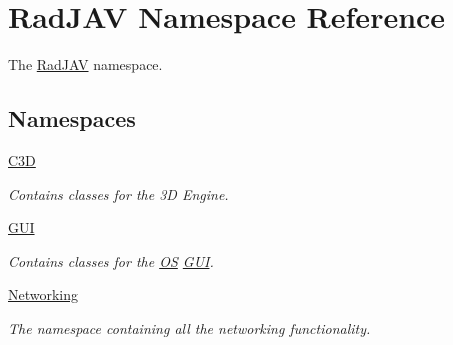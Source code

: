 \hypertarget{namespace_rad_j_a_v}{}\section{Rad\+J\+AV Namespace Reference}
\label{namespace_rad_j_a_v}


The \mbox{\hyperlink{namespace_rad_j_a_v}{Rad\+J\+AV}} namespace.  


\subsection*{Namespaces}
\begin{DoxyCompactItemize}
\item 
 \mbox{\hyperlink{namespace_rad_j_a_v_1_1_c3_d}{C3D}}
\begin{DoxyCompactList}\small\item\em Contains classes for the 3D Engine. \end{DoxyCompactList}\item 
 \mbox{\hyperlink{namespace_rad_j_a_v_1_1_g_u_i}{G\+UI}}
\begin{DoxyCompactList}\small\item\em Contains classes for the \mbox{\hyperlink{class_rad_j_a_v_1_1_o_s}{OS}} \mbox{\hyperlink{namespace_rad_j_a_v_1_1_g_u_i}{G\+UI}}. \end{DoxyCompactList}\item 
 \mbox{\hyperlink{namespace_rad_j_a_v_1_1_networking}{Networking}}
\begin{DoxyCompactList}\small\item\em The namespace containing all the networking functionality. \end{DoxyCompactList}\end{DoxyCompactItemize}

